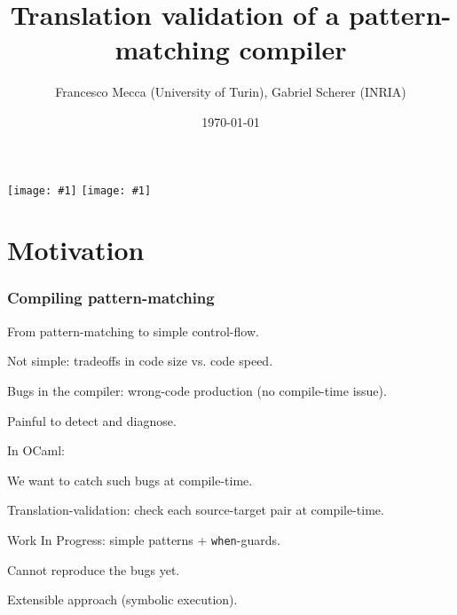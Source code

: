 \documentclass{beamer}
\title{Translation validation of a pattern-matching compiler}
\subtitle{}
\author{Francesco Mecca (University of Turin), Gabriel Scherer (INRIA)}
\date{\today}
\begin{document}

\newcommand{\showface}[1]{\texttt{[image: \#1]}}
\begin{frame}
  \titlepage

\begin{center}
  \showface{pictures/Francesco_Mecca.jpg}
  \showface{pictures/Gabriel_Scherer.jpg}
\end{center}
\end{frame}

\section{Motivation}

\begin{frame}
  \frametitle{Compiling pattern-matching}

  From pattern-matching to simple control-flow.

  Not simple: tradeoffs in code size vs. code speed.

  \vfill

  Bugs in the compiler: wrong-code production (no compile-time issue).

  Painful to detect and diagnose.

  \vfill

  In OCaml: %

  \vfill

  We want to catch such bugs at compile-time.

  Translation-validation: check each source-target pair at compile-time.

  \vfill

  Work In Progress: simple patterns + \texttt{when}-guards.

  Cannot reproduce the bugs yet.

  Extensible approach (symbolic execution).
\end{frame}
\end{document}

